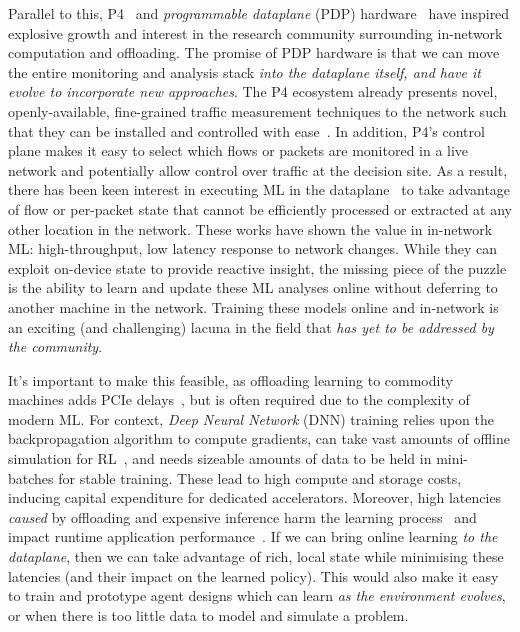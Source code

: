\documentclass[
sigconf,natbib=false
]{acmart}
\begin{document}
Parallel to this, P4~\parencite{DBLP:journals/ccr/BosshartDGIMRSTVVW14} and \emph{programmable dataplane} (PDP) hardware~\parencite{DBLP:journals/micro/ZilbermanACM14, netronome-smartnic, xilinx-alveo, barefoot-intel} have inspired explosive growth and interest in the research community surrounding in-network computation and offloading.
The promise of PDP hardware is that we can move the entire monitoring and analysis stack \emph{into the dataplane itself, and have it evolve to incorporate new approaches}.
The P4 ecosystem already presents novel, openly-available, fine-grained traffic measurement techniques to the network such that they can be installed and controlled with ease~\parencite{DBLP:conf/sigcomm/GuptaHCFRW18,DBLP:conf/sigcomm/ChenFKRR18,DBLP:conf/sosr/GhasemiBR17}.
In addition, P4's control plane makes it easy to select which flows or packets are monitored in a live network and potentially allow control over traffic at the decision site.
As a result, there has been keen interest in executing ML in the dataplane~\parencite{DBLP:conf/hotnets/XiongZ19,DBLP:conf/sigcomm/SanvitoSB18,DBLP:journals/corr/abs-1801-05731,DBLP:journals/corr/abs-2009-02353,langlet-ml-netronome,DBLP:journals/corr/abs-2002-08987} to take advantage of flow or per-packet state that cannot be efficiently processed or extracted at any other location in the network.
These works have shown the value in in-network ML: high-throughput, low latency response to network changes.
While they can exploit on-device state to provide reactive insight, the missing piece of the puzzle is the ability to learn and update these ML analyses online without deferring to another machine in the network.
Training these models online and in-network is an exciting (and challenging) lacuna in the field that \emph{has yet to be addressed by the community}.

It's important to make this feasible, as offloading learning to commodity machines adds PCIe delays~\parencite{DBLP:journals/corr/abs-2009-02353,DBLP:conf/sigcomm/NeugebauerAZAL018}, but is often required due to the complexity of modern ML.
For context, \emph{Deep Neural Network} (DNN) training relies upon the backpropagation algorithm to compute gradients, can take vast amounts of offline simulation for RL~\parencite{DBLP:journals/corr/abs-1912-06680}, and needs sizeable amounts of data to be held in mini-batches for stable training.
These lead to high compute and storage costs, inducing capital expenditure for dedicated accelerators.
Moreover, high latencies \emph{caused} by offloading and expensive inference harm the learning process~\parencite{DBLP:journals/firai/TravnikMSP18} and impact runtime application performance~\parencite{DBLP:journals/corr/abs-1910-04054}.
If we can bring online learning \emph{to the dataplane}, then we can take advantage of rich, local state while minimising these latencies (and their impact on the learned policy).
This would also make it easy to train and prototype agent designs which can learn \emph{as the environment evolves}, or when there is too little data to model and simulate a problem.
\end{document}
